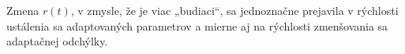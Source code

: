 \documentclass[a4paper, 10pt, ]{article}
\begin{document}
Zmena $r(t)$, v zmysle, že je viac „budiaci“,  sa jednoznačne prejavila v rýchlosti ustálenia sa adaptovaných parametrov a mierne aj na rýchlosti zmenšovania sa adaptačnej odchýlky.









\begin{figure}[!t]
	\centering

    \vspace{-3mm}


    \vspace{-2mm}

	\caption{}
	\label{figsc_ar06_MRAC_6}


    \vspace{-2mm}

\end{figure}








\begin{figure}[!b]
	\centering

    \vspace{-3mm}


    \vspace{-2mm}

	\caption{}
	\label{figsc_ar06_MRAC_7}


    \vspace{-2mm}

\end{figure}
\end{document}
